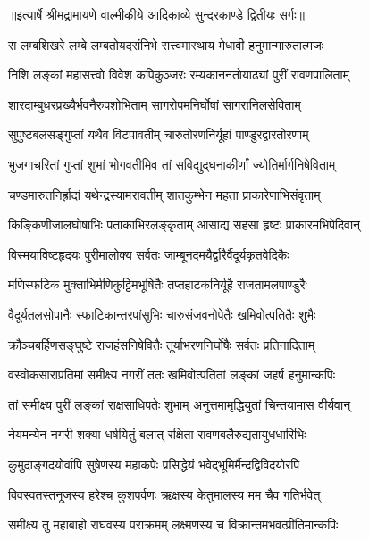 {॥इत्यार्षे श्रीमद्रामायणे वाल्मीकीये आदिकाव्ये सुन्दरकाण्डे द्वितीयः सर्गः॥}


\twolineshloka
{स लम्बशिखरे लम्बे लम्बतोयदसंनिभे}
{सत्त्वमास्थाय मेधावी हनुमान्मारुतात्मजः} %

\twolineshloka
{निशि लङ्कां महासत्त्वो विवेश कपिकुञ्जरः}
{रम्यकाननतोयाढ्यां पुरीं रावणपालिताम्} %

\twolineshloka
{शारदाम्बुधरप्रख्यैर्भवनैरुपशोभिताम्}
{सागरोपमनिर्घोषां सागरानिलसेविताम्} %

\twolineshloka
{सुपुष्टबलसङ्गुप्तां यथैव विटपावतीम्}
{चारुतोरणनिर्यूहां पाण्डुरद्वारतोरणाम्} %

\twolineshloka
{भुजगाचरितां गुप्तां शुभां भोगवतीमिव}
{तां सविद्युद्घनाकीर्णां ज्योतिर्मार्गनिषेविताम्} %

\twolineshloka
{चण्डमारुतनिर्ह्रादां यथेन्द्रस्यामरावतीम्}
{शातकुम्भेन महता प्राकारेणाभिसंवृताम्} %

\twolineshloka
{किङ्किणीजालघोषाभिः पताकाभिरलङ्कृताम्}
{आसाद्य सहसा हृष्टः प्राकारमभिपेदिवान्} %

\twolineshloka
{विस्मयाविष्टहृदयः पुरीमालोक्य सर्वतः}
{जाम्बूनदमयैर्द्वारैर्वैदूर्यकृतवेदिकैः} %

\twolineshloka
{मणिस्फटिक मुक्ताभिर्मणिकुट्टिमभूषितैः}
{तप्तहाटकनिर्यूहै राजतामलपाण्डुरैः} %

\twolineshloka
{वैदूर्यतलसोपानैः स्फाटिकान्तरपांसुभिः}
{चारुसंजवनोपेतैः खमिवोत्पतितैः शुभैः} %

\twolineshloka
{क्रौञ्चबर्हिणसङ्घुष्टे राजहंसनिषेवितैः}
{तूर्याभरणनिर्घोषैः सर्वतः प्रतिनादिताम्} %

\twolineshloka
{वस्वोकसाराप्रतिमां समीक्ष्य नगरीं ततः}
{खमिवोत्पतितां लङ्कां जहर्ष हनुमान्कपिः} %

\twolineshloka
{तां समीक्ष्य पुरीं लङ्कां राक्षसाधिपतेः शुभाम्}
{अनुत्तमामृद्धियुतां चिन्तयामास वीर्यवान्} %

\twolineshloka
{नेयमन्येन नगरी शक्या धर्षयितुं बलात्}
{रक्षिता रावणबलैरुद्यतायुधधारिभिः} %

\twolineshloka
{कुमुदाङ्गदयोर्वापि सुषेणस्य महाकपेः}
{प्रसिद्धेयं भवेद्भूमिर्मैन्दद्विविदयोरपि} %

\twolineshloka
{विवस्वतस्तनूजस्य हरेश्च कुशपर्वणः}
{ऋक्षस्य केतुमालस्य मम चैव गतिर्भवेत्} %

\twolineshloka
{समीक्ष्य तु महाबाहो राघवस्य पराक्रमम्}
{लक्ष्मणस्य च विक्रान्तमभवत्प्रीतिमान्कपिः} %

